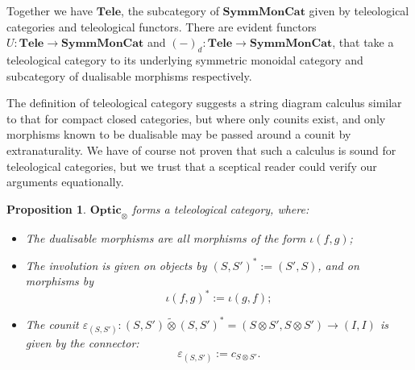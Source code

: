 \documentclass[11pt,letterpaper]{article}
\theoremstyle{plain}
\newtheorem{proposition}[theorem]{Proposition}
\theoremstyle{definition}
\newcommand{\SymmMonCat}{\mathbf{SymmMonCat}}
\newcommand{\Tele}{\mathbf{Tele}}
\newcommand{\Optic}{\mathbf{Optic}}
\newcommand{\switched}{\mathbin{\tilde{\otimes}}}
\begin{document}
Together we have $\Tele$, the subcategory of $\SymmMonCat$ given by teleological categories and teleological functors. There are evident functors $U : \Tele \to \SymmMonCat$ and ${(-)}_d : \Tele \to \SymmMonCat$, that take a teleological category to its underlying symmetric monoidal category and subcategory of dualisable morphisms respectively.

The definition of teleological category suggests a string diagram calculus similar to that for compact closed categories, but where only counits exist, and only morphisms known to be dualisable may be passed around a counit by extranaturality. We have of course not proven that such a calculus is sound for teleological categories, but we trust that a sceptical reader could verify our arguments equationally.

\begin{proposition}
  $\Optic_\otimes$ forms a teleological category, where:
  \begin{itemize}
  \item The dualisable morphisms are all morphisms of the form $\iota(f, g)$;
  \item The involution is given on objects by ${(S, S')}^* := (S', S)$, and on morphisms by \[\iota{(f, g)}^* := \iota(g, f);\]
  \item The counit $\varepsilon_{(S, S')} : (S, S') \switched {(S, S')}^* = (S \otimes S', S \otimes S') \to (I, I)$ is given by the connector: \[\varepsilon_{(S, S')} := c_{S \otimes S'}.\]
  \end{itemize}
\end{proposition}
\end{document}

